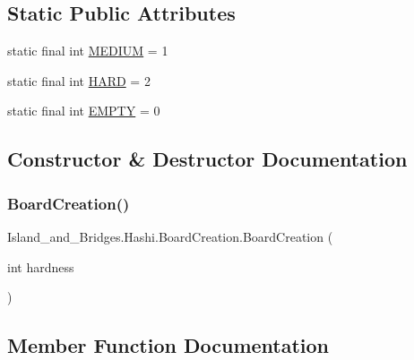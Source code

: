 \subsection*{Static Public Attributes}
\begin{DoxyCompactItemize}
\item 
static final int \mbox{\hyperlink{class_island__and___bridges_1_1_hashi_1_1_board_creation_a49731fcc28b62e76d5663ab6965b2128}{M\+E\+D\+I\+UM}} = 1
\item 
static final int \mbox{\hyperlink{class_island__and___bridges_1_1_hashi_1_1_board_creation_aa6aa60ef50fffc2709f2e222fab2eeb0}{H\+A\+RD}} = 2
\item 
static final int \mbox{\hyperlink{class_island__and___bridges_1_1_hashi_1_1_board_creation_a8b0f0818b9cfcd5e6b626c46a673cedc}{E\+M\+P\+TY}} = 0
\end{DoxyCompactItemize}


\subsection{Constructor \& Destructor Documentation}
\mbox{\label{class_island__and___bridges_1_1_hashi_1_1_board_creation_a16cc074e16325ededb3e7b8c9d49f612}} 
\subsubsection{\texorpdfstring{Board\+Creation()}{BoardCreation()}}
{\footnotesize\ttfamily Island\+\_\+and\+\_\+\+Bridges.\+Hashi.\+Board\+Creation.\+Board\+Creation (\begin{DoxyParamCaption}\item[{int}]{hardness }\end{DoxyParamCaption})}



\subsection{Member Function Documentation}
\mbox{\label{class_island__and___bridges_1_1_hashi_1_1_board_creation_a976ae525617a23880c54d0f588197b48}} 

